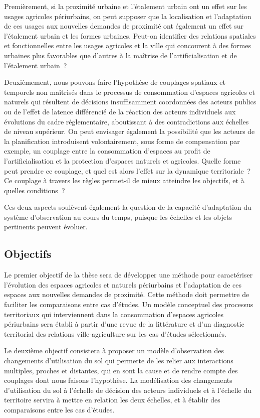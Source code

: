 Premièrement, si la proximité urbaine
et l'étalement urbain ont un effet sur les usages agricoles
périurbains, on peut supposer que la localisation et l'adaptation de ces usages
aux nouvelles demandes de proximité
ont également un effet sur l'étalement urbain et les formes urbaines.
Peut-on identifier des relations spatiales et fonctionnelles entre les usages agricoles
et la ville qui concourent à des formes urbaines
plus favorables que d'autres à la maîtrise de l'artificialisation
et de l'étalement urbain~?

Deuxièmement, nous pouvons faire l'hypothèse de couplages spatiaux et temporels
non maîtrisés dans le processus de consommation d'espaces agricoles et naturels
qui résultent de décisions insuffisamment coordonnées des acteurs publics
ou de l'effet de latence différencié de la réaction des acteurs individuels aux
évolutions du cadre réglementaire,
aboutissant à des contradictions aux échelles de niveau supérieur.
On peut envisager également la possibilité que les acteurs de la planification
introduisent volontairement, sous forme de compensation par exemple, un couplage
entre la consommation d'espaces au profit de l'artificialisation
et la protection d'espaces naturels et agricoles.
Quelle forme peut prendre ce couplage, et quel est alors
l'effet sur la dynamique territoriale~? Ce couplage
à travers les règles permet-il de mieux atteindre les objectifs, et à quelles conditions~?

Ces deux aspects soulèvent également la question de la capacité d'adaptation du système
d'observation au cours du temps, puisque les échelles et les objets pertinents
peuvent évoluer.

\subsection{Objectifs}

Le premier objectif de la thèse sera de développer une méthode pour caractériser
l'évolution des espaces agricoles et naturels périurbains et l'adaptation
de ces espaces aux nouvelles demandes de proximité.
Cette méthode doit permettre de faciliter les comparaisons entre cas d'études.
Un modèle conceptuel des processus territoriaux
qui interviennent dans la consommation d'espaces agricoles périurbains
sera établi à partir d'une revue de la littérature
et d'un diagnostic territorial des relations ville-agriculture
sur les cas d'études sélectionnés.

Le deuxième objectif consistera à proposer un modèle d'observation des changements 
d'utilisation du sol qui permette de les relier aux interactions multiples, proches et distantes,
qui en sont la cause et de rendre compte des couplages
dont nous faisons l'hypothèse.
La modélisation des changements d'utilisation du sol
à l'échelle de décision des acteurs individuels
et à l'échelle du territoire servira à mettre en relation les deux échelles,
et à établir des comparaisons entre les cas d'études.

